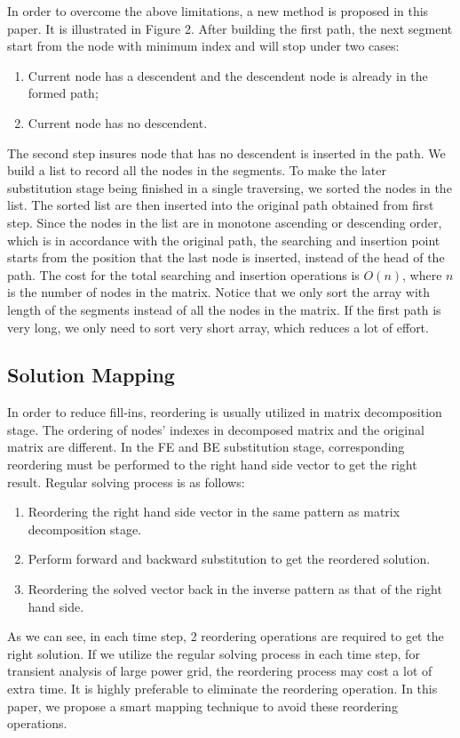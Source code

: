 In order to overcome the above limitations, a new method is proposed in this paper. It is illustrated in Figure 2.
After building the first path, the next segment start from the node with minimum index and will stop under two cases: 
\begin{enumerate}[1)]
\item Current node has a descendent and the descendent node is already in the formed path; 
\item Current node has no descendent.
\end{enumerate} 
The second step insures node that has no descendent is inserted in the path. We build a list to record all the nodes in 
the segments. To make the later substitution stage being finished in a single traversing, we sorted the nodes in the list. The sorted list are then inserted into the original path obtained from first step. Since the nodes in the list are in monotone ascending or descending order, which is in accordance with the original path, the searching and insertion point starts from the position that the last node is inserted, instead of the head of the path. The cost for the total searching and insertion operations is $O(n)$, where $n$ is the number of nodes in 
the matrix. Notice that we only sort the array with length of the segments instead of all the nodes in the matrix. If the first path is 
very long, we only need to sort very short array, which reduces a lot of effort.

 \subsection{Solution Mapping}
In order to reduce fill-ins, reordering is usually utilized in matrix decomposition stage. The ordering of nodes' indexes in decomposed 
matrix and the original matrix are different. In the FE and BE substitution stage, corresponding reordering must 
be performed to the right hand side vector to get the right result. Regular solving process is as follows:
\begin{enumerate}[1)]
\item Reordering the right hand side vector in the same pattern as matrix decomposition stage.
\item Perform forward and backward substitution to get the reordered solution.
\item Reordering the solved vector back in the inverse pattern as that of the right hand side.
\end{enumerate}
As we can see, in each time step, 2 reordering operations are required to get the right solution. If we utilize the regular solving 
process in each time step, for transient analysis of large power grid, the reordering process may cost a lot of extra time. It is highly preferable to eliminate the reordering operation. In this paper, we propose a smart mapping technique to avoid these reordering operations.

